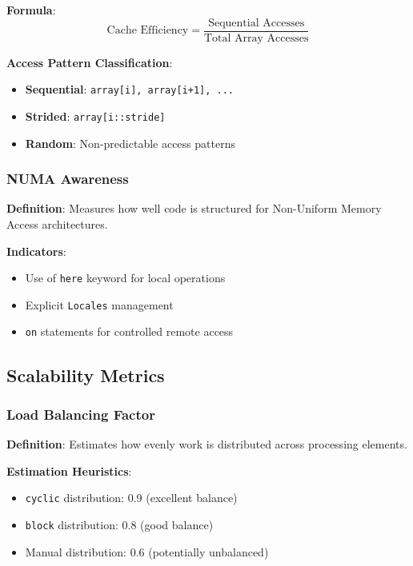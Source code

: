 \documentclass[11pt,a4paper]{article}
\begin{document}
\textbf{Formula}:
\begin{equation}
\text{Cache Efficiency} = \frac{\text{Sequential Accesses}}{\text{Total Array Accesses}}
\end{equation}

\textbf{Access Pattern Classification}:
\begin{itemize}
    \item \textbf{Sequential}: \texttt{array[i], array[i+1], ...}
    \item \textbf{Strided}: \texttt{array[i::stride]}
    \item \textbf{Random}: Non-predictable access patterns
\end{itemize}

\subsubsection{NUMA Awareness}

\textbf{Definition}: Measures how well code is structured for Non-Uniform Memory Access architectures.

\textbf{Indicators}:
\begin{itemize}
    \item Use of \texttt{here} keyword for local operations
    \item Explicit \texttt{Locales} management
    \item \texttt{on} statements for controlled remote access
\end{itemize}

\subsection{Scalability Metrics}

\subsubsection{Load Balancing Factor}

\textbf{Definition}: Estimates how evenly work is distributed across processing elements.

\textbf{Estimation Heuristics}:
\begin{itemize}
    \item \texttt{cyclic} distribution: 0.9 (excellent balance)
    \item \texttt{block} distribution: 0.8 (good balance)
    \item Manual distribution: 0.6 (potentially unbalanced)
\end{itemize}
\end{document}

